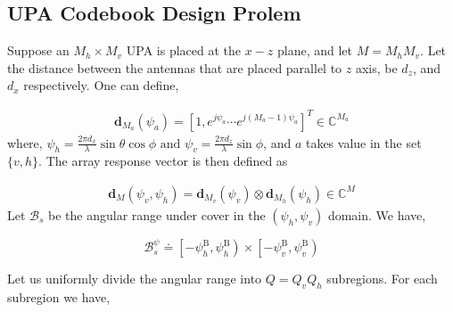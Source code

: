\subsection{UPA Codebook Design Prolem}

Suppose an $M_h \times M_v$ UPA is placed at the $x-z$ plane, and let $M = M_h M_v$. Let the distance between the antennas that are placed parallel to $z$ axis, be $d_z$, and $d_x$ respectively. One can define,

\begin{align}
\mathbf{d}_{M_{a}}\left(\psi_{a}\right) = \left[1, e^{j \psi_{a}} \cdots e^{j\left(M_{a}-1\right) \psi_{a}}\right]^{T} \in \mathbb{C}^{M_{a}}
\end{align}
where, $\psi_{h}=\frac{2 \pi d_{x}}{\lambda} \sin \theta \cos \phi \text { and } \psi_{v}=\frac{2 \pi d_{z}}{\lambda} \sin \phi$, and $a$ takes value in the set $\{v, h\}$.  
The array response vector is then defined as 

\begin{align}
    \mathbf{d}_{M}\left(\psi_{v}, \psi_{h}\right) =
    \mathbf{d}_{M_{v}}\left(\psi_{v}\right) \otimes
    \mathbf{d}_{M_{h}}\left(\psi_{h}\right)  \in \mathbb{C}^{M}
\end{align}
Let $\mathcal{B}_s$ be the angular range under cover in the $(\psi_h, \psi_v)$ domain. We have, 

\begin{equation}
    \mathcal{B}^\psi_{s} \doteq\left[-\psi_h^{\mathrm{B}}, \psi_h^{\mathrm{B}}\right) \times\left[-\psi_v^{\mathrm{B}}, \psi_v^{\mathrm{B}}\right)
\end{equation}



Let us uniformly divide the angular range  into $Q=Q_{v} Q_{h}$ subregions. For each subregion we have, 




